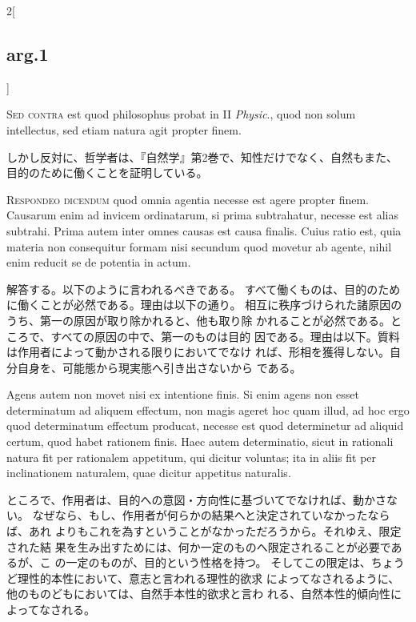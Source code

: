 \documentclass[paper=a4paper,fontsize=10pt,jafontsize=9pt,titlepage]{jlreq}
\begin{document}
\begin{paracol}{2}[\subsection{arg.1}]
\switchcolumn*[\subsection{s.c.}]

{\scshape Sed contra} est quod philosophus probat
in II {\itshape Physic}., quod non solum intellectus, sed etiam natura agit propter
finem.

\switchcolumn

しかし反対に、哲学者は、『自然学』第2巻で、知性だけでなく、自然もまた、
 目的のために働くことを証明している。


{\scshape Respondeo dicendum} quod omnia agentia
necesse est agere propter finem. Causarum enim ad invicem ordinatarum,
si prima subtrahatur, necesse est alias subtrahi. Prima autem inter
omnes causas est causa finalis. Cuius ratio est, quia materia non
consequitur formam nisi secundum quod movetur ab agente, nihil enim
reducit se de potentia in actum.

\switchcolumn

解答する。以下のように言われるべきである。
すべて働くものは、目的のために働くことが必然である。理由は以下の通り。
相互に秩序づけられた諸原因のうち、第一の原因が取り除かれると、他も取り除
 かれることが必然である。ところで、すべての原因の中で、第一のものは目的
 因である。理由は以下。質料は作用者によって動かされる限りにおいてでなけ
 れば、形相を獲得しない。自分自身を、可能態から現実態へ引き出さないから
 である。

\switchcolumn*

Agens autem non movet nisi ex
intentione finis. Si enim agens non esset determinatum ad aliquem
effectum, non magis ageret hoc quam illud, ad hoc ergo quod determinatum
effectum producat, necesse est quod determinetur ad aliquid certum, quod
habet rationem finis. Haec autem determinatio, sicut in rationali natura
fit per rationalem appetitum, qui dicitur voluntas; ita in aliis fit per
inclinationem naturalem, quae dicitur appetitus naturalis.

\switchcolumn

ところで、作用者は、目的への意図・方向性に基づいてでなければ、動かさない。
なぜなら、もし、作用者が何らかの結果へと決定されていなかったならば、あれ
 よりもこれを為すということがなかっただろうから。それゆえ、限定された結
 果を生み出すためには、何か一定のものへ限定されることが必要であるが、こ
 の一定のものが、目的という性格を持つ。
そしてこの限定は、ちょうど理性的本性において、意志と言われる理性的欲求
 によってなされるように、他のものどもにおいては、自然手本性的欲求と言わ
 れる、自然本性的傾向性によってなされる。


\end{paracol}
\end{document}
